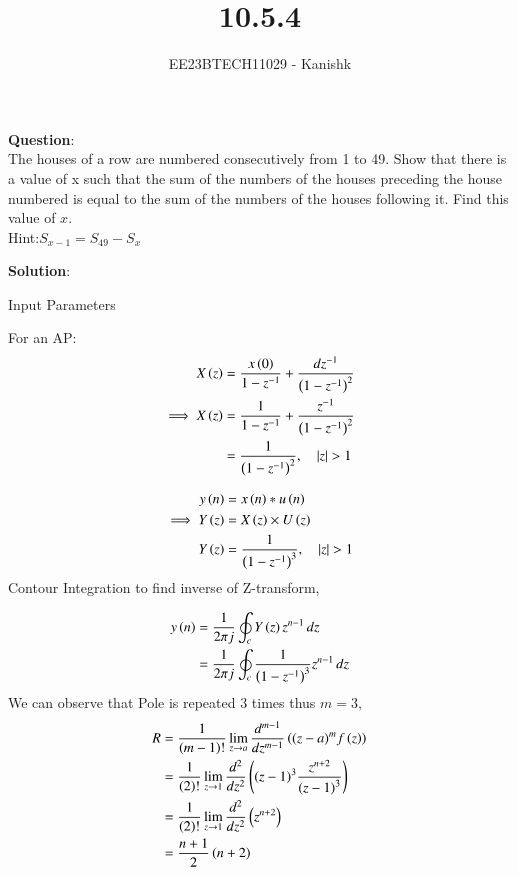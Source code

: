 \documentclass[journal,12pt,twocolumn]{IEEEtran}
\theoremstyle{remark}
\begin{document}

\vspace{3cm}

\title{10.5.4}
\author{EE23BTECH11029 - Kanishk}
\maketitle
\newpage

\bigskip

\renewcommand{\thefigure}{\theenumi}
\renewcommand{\thetable}{\theenumi}
\textbf{Question}:\\
The houses of a row are numbered consecutively from 1 to 49. Show that there is a value
of x such that the sum of the numbers of the houses preceding the house numbered is equal to the sum of the numbers of the houses following it. Find this value of $x$.\\
Hint:$ S_{x-1}=S_{49}-S_x$

\textbf{Solution}:\\

\begin{table}[ht]
    \centering
    \def\arraystretch{1.5}
    
   \caption{Input Parameters}
   \label{tab:10.5.4}
\end{table}


For an AP:
\begin{align}
X\left(z\right)&=\frac{x\left(0\right)}{1-z^{-1}}+ \frac{dz^{-1}}{\left(1-z^{-1}\right)^{2}}\\
\implies X\left(z\right)&=\frac{1}{1-z^{-1}}+ \frac{z^{-1}}{\left(1-z^{-1}\right)^{2}}\\
&=\frac{1}{\left(1-z^{-1}\right)^{2}},\quad \left\vert z\right\vert > 1
\end{align}

\begin{align}
y\left(n\right)&=x\left(n\right)*u\left(n\right)\\
\implies Y\left(z\right)&=X\left(z\right)\times U\left(z\right)\\
Y\left(z\right)&= \frac{1}{\left(1-z^{-1}\right)^{3}},\quad \left\vert z\right\vert>1
\end{align}
Contour Integration to find inverse of Z-transform,

\begin{align}
y\left(n\right)&=\frac{1}{2\pi j}\oint_c Y\left(z\right)z^{n-1} \,dz\\
&=\frac{1}{2\pi j} \oint_c \frac{1}{\left(1-z^{-1}\right)^{3}}z^{n-1} \,dz
\end{align}
We can observe that Pole is repeated 3 times thus $m=3$,
\begin{align}
R&=\frac{1}{\left(m-1\right)!}\lim\limits_{z\to a}\frac{d^{m-1}}{dz^{m-1}}\left({(z-a)}^{m}f\left(z\right)\right)  \\
&=\frac{1}{\left(2\right)!}\lim\limits_{z\to 1}\frac{d^{2}}{dz^{2}}\left({(z-1)}^{3}\frac{z^{n+2}}{{(z-1)}^3}\right)\\
&=\frac{1}{\left(2\right)!}\lim\limits_{z\to 1}\frac{d^{2}}{dz^{2}}\left(z^{n+2}\right)\\
&=\frac{n+1}{2}\left(n+2\right)
\end{align}
\end{document}
